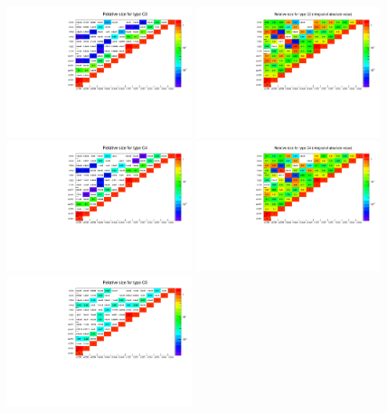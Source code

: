 \documentclass{cmspaper}
\begin{document}
\begin{figure}[htb!]
  \begin{center}
    \includegraphics[width=0.48\textwidth]{figures/InterferenceSizeUsualIntegral_C3.pdf}
    \includegraphics[width=0.48\textwidth]{figures/InterferenceSizeAbsoluteIntegral_C3.pdf}\\
    \includegraphics[width=0.48\textwidth]{figures/InterferenceSizeUsualIntegral_C4.pdf}
    \includegraphics[width=0.48\textwidth]{figures/InterferenceSizeAbsoluteIntegral_C4.pdf}\\
    \includegraphics[width=0.48\textwidth]{figures/InterferenceSizeUsualIntegral_C5.pdf}

\end{center}
\end{figure}
\end{document}
